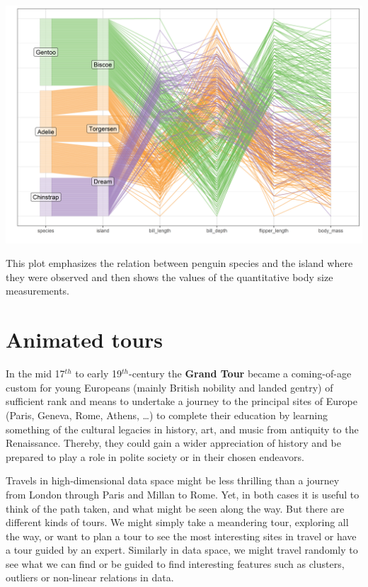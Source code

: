 \documentclass[
  letterpaper,
  10pt,
  krantz2]{krantz}
\begin{document}
\begin{center}
\includegraphics[width=18in,height=\textheight]{figs/fig-peng-ggpcp2-1.png}
\end{center}

This plot emphasizes the relation between penguin species and the island
where they were observed and then shows the values of the quantitative
body size measurements.

\section{Animated tours}\label{animated-tours}

In the mid 17\(^{th}\) to early 19\(^{th}\)-century the \textbf{Grand
Tour} became a coming-of-age custom for young Europeans (mainly British
nobility and landed gentry) of sufficient rank and means to undertake a
journey to the principal sites of Europe (Paris, Geneva, Rome, Athens,
\ldots) to complete their education by learning something of the
cultural legacies in history, art, and music from antiquity to the
Renaissance. Thereby, they could gain a wider appreciation of history
and be prepared to play a role in polite society or in their chosen
endeavors.

Travels in high-dimensional data space might be less thrilling than a
journey from London through Paris and Millan to Rome. Yet, in both cases
it is useful to think of the path taken, and what might be seen along
the way. But there are different kinds of tours. We might simply take a
meandering tour, exploring all the way, or want to plan a tour to see
the most interesting sites in travel or have a tour guided by an expert.
Similarly in data space, we might travel randomly to see what we can
find or be guided to find interesting features such as clusters,
outliers or non-linear relations in data.
\end{document}
